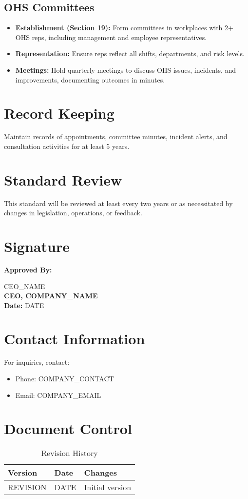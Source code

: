 \documentclass[12pt]{article}
\begin{document}
\subsection{OHS Committees}
\begin{itemize}
    \item \textbf{Establishment (Section 19):} Form committees in workplaces with 2+ OHS reps, including management and employee representatives.
    \item \textbf{Representation:} Ensure reps reflect all shifts, departments, and risk levels.
    \item \textbf{Meetings:} Hold quarterly meetings to discuss OHS issues, incidents, and improvements, documenting outcomes in minutes.
\end{itemize}

\section{Record Keeping}
Maintain records of appointments, committee minutes, incident alerts, and consultation activities for at least 5 years.

\section{Standard Review}
This standard will be reviewed at least every two years or as necessitated by changes in legislation, operations, or feedback.

\section{Signature}
\textbf{Approved By:}

{{CEO_NAME}}\\
\textbf{CEO, {{COMPANY_NAME}}}\\
\textbf{Date:} {{DATE}}

\section{Contact Information}
For inquiries, contact:
\begin{itemize}
    \item Phone: {{COMPANY_CONTACT}}
    \item Email: {{COMPANY_EMAIL}}
\end{itemize}

\section{Document Control}
\begin{table}[h]
    \centering
    \begin{tabular}{p{3cm}p{3cm}p{6cm}}
        \toprule
        \textbf{Version} & \textbf{Date} & \textbf{Changes} \\
        \midrule
        {{REVISION}} & {{DATE}} & Initial version \\
        \bottomrule
    \end{tabular}
    \caption{Revision History}
\end{table}
\end{document}
